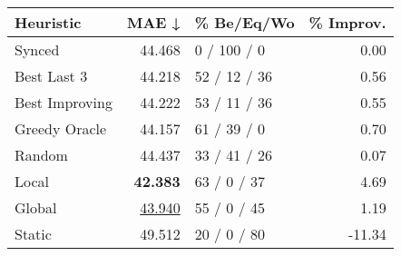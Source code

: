 \begin{tabular}{lrlr}
\toprule
\textbf{Heuristic} & \textbf{MAE ↓} & \textbf{\% Be/Eq/Wo} & \textbf{\% Improv.} \\
\midrule
            Synced &         44.468 &          0 / 100 / 0 &                0.00 \\
\midrule
       Best Last 3 &         44.218 &         52 / 12 / 36 &                0.56 \\
    Best Improving &         44.222 &         53 / 11 / 36 &                0.55 \\
\addlinespace
     Greedy Oracle &         44.157 &          61 / 39 / 0 &                0.70 \\
            Random &         44.437 &         33 / 41 / 26 &                0.07 \\
\midrule
             Local &         \textbf{42.383} &          63 / 0 / 37 &                4.69 \\
            Global &         \underline{43.940} &          55 / 0 / 45 &                1.19 \\
\midrule
            Static &         49.512 &          20 / 0 / 80 &              -11.34 \\
\bottomrule
\end{tabular}

\label{tab:non_lr01_le1_bs4_Summary}
